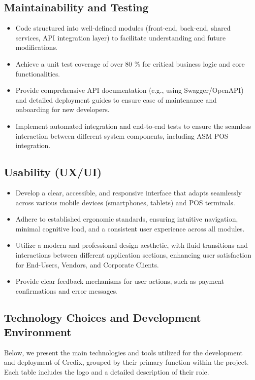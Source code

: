 \subsection{Maintainability and Testing}
\begin{itemize}
    \item Code structured into well-defined modules (front-end, back-end, shared services, API integration layer) to facilitate understanding and future modifications.
    \item Achieve a unit test coverage of over 80 \% for critical business logic and core functionalities.
    \item Provide comprehensive API documentation (e.g., using Swagger/OpenAPI) and detailed deployment guides to ensure ease of maintenance and onboarding for new developers.
    \item Implement automated integration and end-to-end tests to ensure the seamless interaction between different system components, including ASM POS integration.
\end{itemize}

\subsection{Usability (UX/UI)}
\begin{itemize}
    \item Develop a clear, accessible, and responsive interface that adapts seamlessly across various mobile devices (smartphones, tablets) and POS terminals.
    \item Adhere to established ergonomic standards, ensuring intuitive navigation, minimal cognitive load, and a consistent user experience across all modules.
    \item Utilize a modern and professional design aesthetic, with fluid transitions and interactions between different application sections, enhancing user satisfaction for End-Users, Vendors, and Corporate Clients.
    \item Provide clear feedback mechanisms for user actions, such as payment confirmations and error messages.
\end{itemize}

\subsection{Technology Choices and Development Environment}

Below, we present the main technologies and tools utilized for the development and deployment of Credix, grouped by their primary function within the project. Each table includes the logo and a detailed description of their role.

